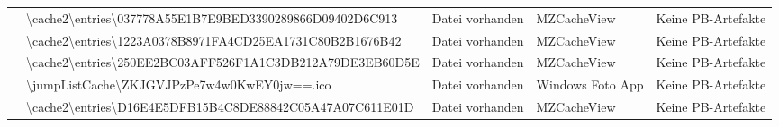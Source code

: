 \begin{appendices}
{\begin{landscape}
\begin{table}[h!]
{\begin{tabular}{cllll}
	\multicolumn{1}{|c|}{}                                                                                       & \multicolumn{1}{l|}{\cellcolor[HTML]{34CDF9}\textbackslash{}cache2\textbackslash{}entries\textbackslash{}037778A55E1B7E9BED3390289866D09402D6C913}                                                                  & \multicolumn{1}{l|}{\cellcolor[HTML]{009901}Datei vorhanden}                                      & \multicolumn{1}{l|}{MZCacheView}            & \multicolumn{1}{l|}{\cellcolor[HTML]{F8A102}Keine PB-Artefakte} \\ \cline{2-5} 
	\multicolumn{1}{|c|}{}                                                                                       & \multicolumn{1}{l|}{\cellcolor[HTML]{34CDF9}\textbackslash{}cache2\textbackslash{}entries\textbackslash{}1223A0378B8971FA4CD25EA1731C80B2B1676B42}                                                                  & \multicolumn{1}{l|}{\cellcolor[HTML]{009901}Datei vorhanden}                                      & \multicolumn{1}{l|}{MZCacheView}            & \multicolumn{1}{l|}{\cellcolor[HTML]{F8A102}Keine PB-Artefakte} \\ \cline{2-5} 
	\multicolumn{1}{|c|}{}                                                                                       & \multicolumn{1}{l|}{\cellcolor[HTML]{34CDF9}\textbackslash{}cache2\textbackslash{}entries\textbackslash{}250EE2BC03AFF526F1A1C3DB212A79DE3EB60D5E}                                                                  & \multicolumn{1}{l|}{\cellcolor[HTML]{009901}Datei vorhanden}                                      & \multicolumn{1}{l|}{MZCacheView}            & \multicolumn{1}{l|}{\cellcolor[HTML]{F8A102}Keine PB-Artefakte} \\ \cline{2-5} 
	\multicolumn{1}{|c|}{}                                                                                       & \multicolumn{1}{l|}{\cellcolor[HTML]{34CDF9}\textbackslash{}jumpListCache\textbackslash{}ZKJGVJPzPe7w4w0KwEY0jw==.ico}                                                                                              & \multicolumn{1}{l|}{\cellcolor[HTML]{009901}Datei vorhanden}                                      & \multicolumn{1}{l|}{Windows Foto App}            & \multicolumn{1}{l|}{\cellcolor[HTML]{F8A102}Keine PB-Artefakte} \\ \cline{2-5} 
	\multicolumn{1}{|c|}{}                                                                                       & \multicolumn{1}{l|}{\cellcolor[HTML]{34CDF9}\textbackslash{}cache2\textbackslash{}entries\textbackslash{}D16E4E5DFB15B4C8DE88842C05A47A07C611E01D}                                                                  & \multicolumn{1}{l|}{\cellcolor[HTML]{009901}Datei vorhanden}                                      & \multicolumn{1}{l|}{MZCacheView}            & \multicolumn{1}{l|}{\cellcolor[HTML]{F8A102}Keine PB-Artefakte} \\ \cline{2-5} 

\end{tabular}}
\end{table}
\end{landscape}}
\end{appendices}
